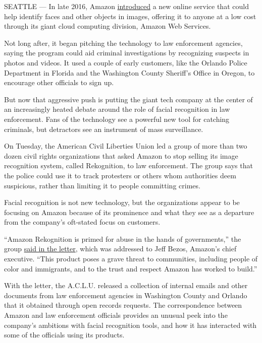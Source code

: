 SEATTLE --- In late 2016, Amazon
\href{https://aws.amazon.com/blogs/aws/amazon-rekognition-image-detection-and-recognition-powered-by-deep-learning/}{introduced}
a new online service that could help identify faces and other objects in
images, offering it to anyone at a low cost through its giant cloud
computing division, Amazon Web Services.

Not long after, it began pitching the technology to law enforcement
agencies, saying the program could aid criminal investigations by
recognizing suspects in photos and videos. It used a couple of early
customers, like the Orlando Police Department in Florida and the
Washington County Sheriff's Office in Oregon, to encourage other
officials to sign up.

But now that aggressive push is putting the giant tech company at the
center of an increasingly heated debate around the role of facial
recognition in law enforcement. Fans of the technology see a powerful
new tool for catching criminals, but detractors see an instrument of
mass surveillance.

On Tuesday, the American Civil Liberties Union led a group of more than
two dozen civil rights organizations that asked Amazon to stop selling
its image recognition system, called Rekognition, to law enforcement.
The group says that the police could use it to track protesters or
others whom authorities deem suspicious, rather than limiting it to
people committing crimes.

Facial recognition is not new technology, but the organizations appear
to be focusing on Amazon because of its prominence and what they see as
a departure from the company's oft-stated focus on customers.

``Amazon Rekognition is primed for abuse in the hands of governments,''
the group
\href{https://www.aclunc.org/docs/20180522_AR_Coalition_Letter.pdf}{said
in the letter}, which was addressed to Jeff Bezos, Amazon's chief
executive. ``This product poses a grave threat to communities, including
people of color and immigrants, and to the trust and respect Amazon has
worked to build.''

With the letter, the A.C.L.U. released a collection of internal emails
and other documents from law enforcement agencies in Washington County
and Orlando that it obtained through open records requests. The
correspondence between Amazon and law enforcement officials provides an
unusual peek into the company's ambitions with facial recognition tools,
and how it has interacted with some of the officials using its products.

